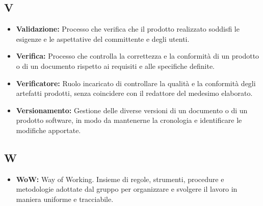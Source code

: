 
{}
\subsection*{V}

\begin{itemize}
    \item \textbf{Validazione:} Processo che verifica che il prodotto realizzato soddisfi le esigenze e le aspettative del committente e degli utenti.
    \item \textbf{Verifica:} Processo che controlla la correttezza e la conformità di un prodotto o di un documento rispetto ai requisiti e alle specifiche definite.
    \item \textbf{Verificatore:} Ruolo incaricato di controllare la qualità e la conformità degli artefatti prodotti, senza coincidere con il redattore del medesimo elaborato.
    \item \textbf{Versionamento:} Gestione delle diverse versioni di un documento o di un prodotto software, in modo da mantenerne la cronologia e identificare le modifiche apportate.
\end{itemize}


{}
\subsection*{W}

\begin{itemize}
    \item \textbf{WoW:} Way of Working. Insieme di regole, strumenti, procedure e metodologie adottate dal gruppo per organizzare e svolgere il lavoro in maniera uniforme e tracciabile.
\end{itemize}



